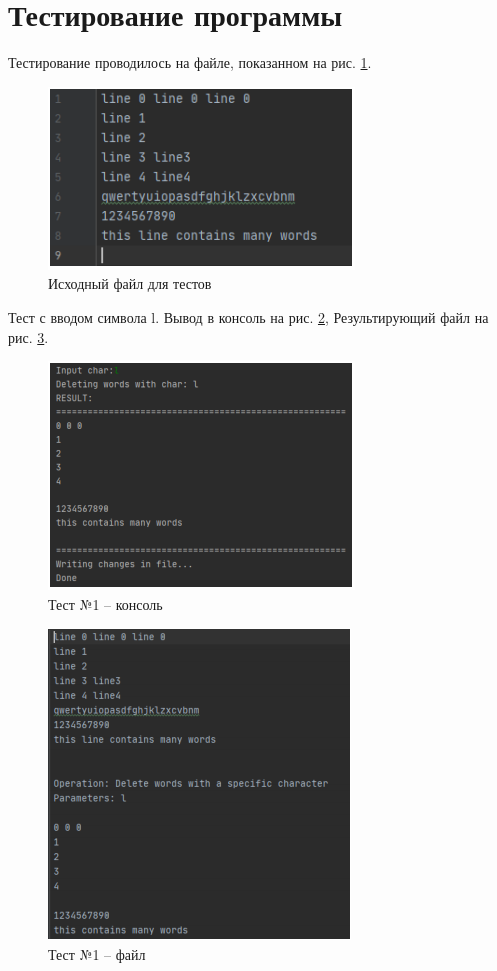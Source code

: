 \section*{Тестирование программы}
	
Тестирование проводилось на файле, показанном на рис. \ref{file_example}.

\begin{figure}[h]
	\centering
	\includegraphics[width=0.6\linewidth]{photo/file_example}
	\caption{Исходный файл для тестов}
	\label{file_example}
\end{figure}

Тест с вводом символа l. Вывод в консоль на рис. \ref{test.1.console}, Результирующий
файл на рис. \ref{test.1.file}.

\begin{figure}[H]
	\centering
	\includegraphics[width=0.6\linewidth]{photo/test.1.console}
	\caption{Тест №1 -- консоль}
	\label{test.1.console}
\end{figure}

\begin{figure}[H]
	\centering
	\includegraphics[width=0.6\linewidth]{photo/test.1.file}
	\caption{Тест №1 -- файл}
	\label{test.1.file}
\end{figure}

